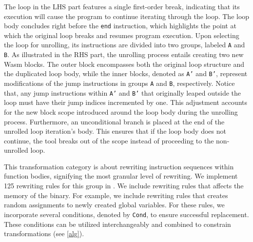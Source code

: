 The loop in the LHS part features a single first-order break, indicating that its execution will cause the program to continue iterating through the loop. 
The loop body concludes right before the \texttt{end} instruction, which highlights the point at which the original loop breaks and resumes program execution.
Upon selecting the loop for unrolling, its instructions are divided into two groups, labeled \texttt{A} and \texttt{B}. 
As illustrated in the RHS part, the unrolling process entails creating two new Wasm blocks. 
The outer block encompasses both the original loop structure and the duplicated loop body, while the inner blocks, denoted as \texttt{A'} and \texttt{B'}, represent modifications of the jump instructions in groups \texttt{A} and \texttt{B}, respectively.
Notice that, any jump instructions within \texttt{A'} and \texttt{B'} that originally leaped outside the loop must have their jump indices incremented by one. 
This adjustment accounts for the new block scope introduced around the loop body during the unrolling process. 
Furthermore, an unconditional branch is placed at the end of the unrolled loop iteration's body. 
This ensures that if the loop body does not continue, the tool breaks out of the scope instead of proceeding to the non-unrolled loop.




This transformation category is about rewriting instruction sequences within function bodies, signifying the most granular level of rewriting. 
We implement 125 rewriting rules for this group in \tool. 
We include rewriting rules that affects the memory of the binary.
For example, we include rewriting rules that creates random assignments to newly created global variables.
For these rules, we incorporate several conditions, denoted by \texttt{Cond}, to ensure successful replacement. 
These conditions can be utilized interchangeably and combined to constrain transformations (see \autoref{alg}).

